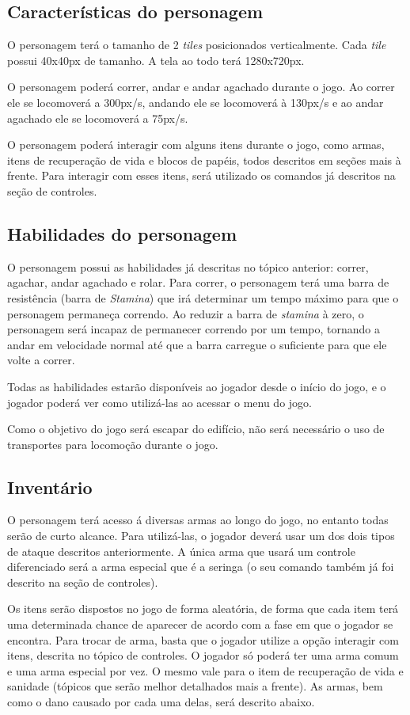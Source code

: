 \subsection{Características do personagem}
O personagem terá o tamanho de 2 \textit{tiles} posicionados verticalmente. Cada \textit{tile} possui 40x40px de tamanho. A tela ao todo terá 1280x720px. 

O personagem poderá correr, andar e andar agachado durante o jogo. Ao correr ele se locomoverá a 300px/s, andando ele se locomoverá à 130px/s e ao andar agachado ele se locomoverá a 75px/s.

O personagem poderá interagir com alguns itens durante o jogo, como armas, itens de recuperação de vida e blocos de papéis, todos descritos em seções mais à frente. Para interagir com esses itens, será utilizado os comandos já descritos na seção de controles.

\subsection{Habilidades do personagem}
O personagem possui as habilidades já descritas no tópico anterior: correr, agachar, andar agachado e rolar. Para correr, o personagem terá uma barra de resistência (barra de \textit{Stamina}) que irá determinar um tempo máximo para que o personagem permaneça correndo. Ao reduzir a barra de \textit{stamina} à zero, o personagem será incapaz de permanecer correndo por um tempo, tornando a andar em velocidade normal até que a barra carregue o suficiente para que ele volte a correr.

Todas as habilidades estarão disponíveis ao jogador desde o início do jogo, e o jogador poderá ver como utilizá-las ao acessar  o menu do jogo.

Como o objetivo do jogo será escapar do edifício, não será necessário o uso de transportes para locomoção durante o jogo. 

\subsection{\label{armas}Inventário}
O personagem terá acesso á diversas armas ao longo do jogo, no entanto todas serão de curto alcance. Para utilizá-las, o jogador deverá usar um dos dois tipos de ataque descritos anteriormente. A única arma que usará um controle diferenciado será a arma especial que é a seringa (o seu comando também já foi descrito na seção de controles). 

Os itens serão dispostos no jogo de forma aleatória, de forma que cada item terá uma determinada chance de aparecer de acordo com a fase em que o jogador se encontra. Para trocar de arma, basta que o jogador utilize a opção interagir com itens, descrita no tópico de controles. O jogador só poderá ter uma arma comum e uma arma especial por vez. O mesmo vale para o item de recuperação de vida e sanidade (tópicos que serão melhor detalhados mais a frente). As armas, bem como o dano causado por cada uma delas, será descrito abaixo.

